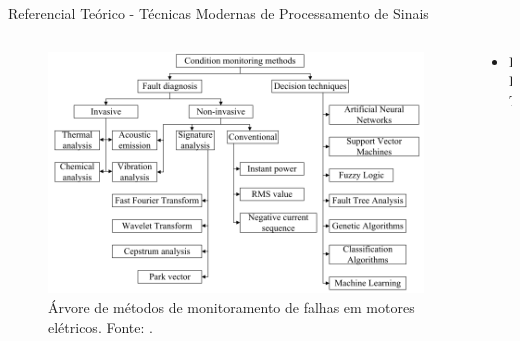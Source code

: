 \documentclass[aspectratio=169]{beamer}
\begin{document}

\begin{frame}{Referencial Teórico - Técnicas Modernas de Processamento de Sinais}
	\begin{columns}
    	\begin{column}{0.50\textwidth}
			\begin{figure}[HT]
				\begin{center}
					\includegraphics[scale=.5]{../referencial/img/monitoring_methods_rilski_p78.png}
					\caption{Árvore de métodos de monitoramento de falhas em motores elétricos. \newline
					Fonte: .} 
					\label{fig:monitoring_methods_rilski_p78}
				\end{center}
			\end{figure}
     	\end{column}
		
		\begin{column}{0.5\textwidth}
			\begin{itemize}
				\item FFT 
			\end{itemize}			
	 	\end{column}
	 \end{columns}
\end{frame}
\end{document}
